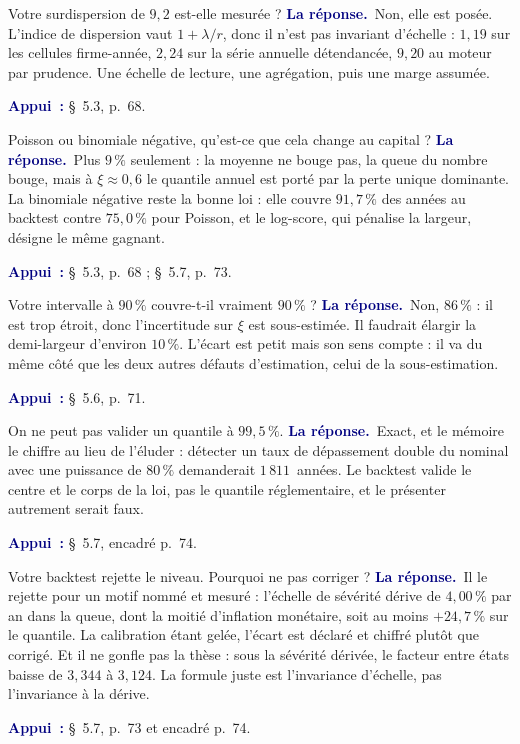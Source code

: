 \documentclass[11pt,a4paper]{article}
\newcommand{\rep}[1]{\smallskip\noindent\textcolor{navy}{\textbf{La réponse.}}\ #1\par}
\newcommand{\appui}[1]{\smallskip\noindent\small\textcolor{navy}{\textbf{Appui~:}} #1\par\normalsize}
\begin{document}
\begin{question}{\og Votre surdispersion de $9{,}2$ est-elle mesurée ?\fg{}}
\rep{Non, elle est posée. L'indice de dispersion vaut $1+\lambda/r$, donc il n'est pas invariant
d'échelle : $1{,}19$ sur les cellules firme-année, $2{,}24$ sur la série annuelle détendancée,
$9{,}20$ au moteur par prudence. Une échelle de lecture, une agrégation, puis une marge assumée.}
\appui{\S~5.3, p.~68.}
\end{question}

\begin{question}{\og Poisson ou binomiale négative, qu'est-ce que cela change au capital ?\fg{}}
\rep{Plus $9\,\%$ seulement : la moyenne ne bouge pas, la queue du nombre bouge, mais à
$\xi\approx0{,}6$ le quantile annuel est porté par la perte unique dominante. La binomiale
négative reste la bonne loi : elle couvre $91{,}7\,\%$ des années au backtest contre $75{,}0\,\%$
pour Poisson, et le log-score, qui pénalise la largeur, désigne le même gagnant.}
\appui{\S~5.3, p.~68 ; \S~5.7, p.~73.}
\end{question}

\begin{question}{\og Votre intervalle à $90\,\%$ couvre-t-il vraiment $90\,\%$ ?\fg{}}
\rep{Non, $86\,\%$ : il est trop étroit, donc l'incertitude sur $\xi$ est sous-estimée. Il
faudrait élargir la demi-largeur d'environ $10\,\%$. L'écart est petit mais son sens compte : il
va du même côté que les deux autres défauts d'estimation, celui de la sous-estimation.}
\appui{\S~5.6, p.~71.}
\end{question}

\begin{question}{\og On ne peut pas valider un quantile à $99{,}5\,\%$.\fg{}}
\rep{Exact, et le mémoire le chiffre au lieu de l'éluder : détecter un taux de dépassement double
du nominal avec une puissance de $80\,\%$ demanderait $1\,811$~années. Le backtest valide le
centre et le corps de la loi, pas le quantile réglementaire, et le présenter autrement serait
faux.}
\appui{\S~5.7, encadré p.~74.}
\end{question}

\begin{question}{\og Votre backtest rejette le niveau. Pourquoi ne pas corriger ?\fg{}}
\rep{Il le rejette pour un motif nommé et mesuré : l'échelle de sévérité dérive de $4{,}00\,\%$
par an dans la queue, dont la moitié d'inflation monétaire, soit au moins $+24{,}7\,\%$ sur le
quantile. La calibration étant gelée, l'écart est déclaré et chiffré plutôt que corrigé. Et il ne
gonfle pas la thèse : sous la sévérité dérivée, le facteur entre états baisse de $3{,}344$ à
$3{,}124$. La formule juste est l'invariance d'échelle, pas l'invariance à la dérive.}
\appui{\S~5.7, p.~73 et encadré p.~74.}
\end{question}
\end{document}
